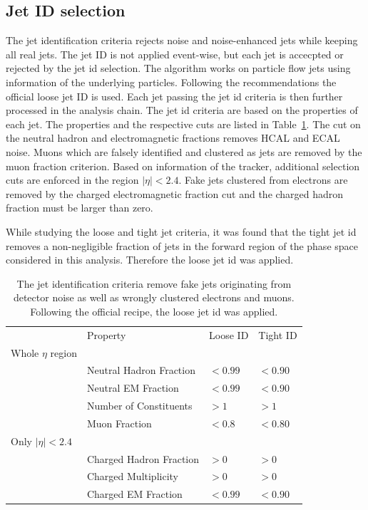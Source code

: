 \subsection{Jet ID selection}

The jet identification criteria rejects noise and noise-enhanced
jets while keeping all real jets. The jet ID is not applied event-wise, but each
jet is accecpted or rejected by the jet id selection. The algorithm works on
particle flow jets using information of the underlying particles. 
Following the recommendations the official loose jet ID is used. Each jet
passing the jet id criteria is then further processed in the analysis chain. The
jet id criteria are based on the properties of each jet. The properties and the
respective cuts are listed in Table~\ref{tab:jetid}. The cut on the neutral
hadron and electromagnetic fractions removes HCAL and ECAL noise. Muons which
are falsely identified and clustered as jets are removed by the muon fraction
criterion. Based on information of the tracker, additional selection cuts are
enforced in the region $|\eta| < 2.4$. Fake jets clustered from electrons are
removed by the charged electromagnetic fraction cut and the charged hadron
fraction must be larger than zero.

While studying the loose and tight jet criteria, it was found that the tight jet
id removes a non-negligible fraction of jets in the forward region of the
phase space considered in this analysis. Therefore the loose jet id was applied.

\begin{table}[htbp]
    \centering
    \caption[Jet Identification Criteria]{The jet identification criteria remove fake jets originating from
    detector noise as well as wrongly clustered electrons and muons. Following
    the official recipe, the loose jet id was applied.}
    \label{tab:jetid}
    \begin{tabular}{llll}
    \toprule
                           & Property                & Loose ID & Tight ID\\\cmidrule(lr){2-4}
    Whole $\eta$ region    &                         &          & \\\cmidrule(lr){1-1}
                           & Neutral Hadron Fraction & $< 0.99$ & $< 0.90$\\
                           & Neutral EM Fraction     & $< 0.99$ & $< 0.90$\\
                           & Number of Constituents  & $> 1$    & $> 1$\\
                           & Muon Fraction           & $< 0.8$  & $< 0.80$\\
    Only $|\eta| < 2.4$    &                         &          & \\\cmidrule(lr){1-1}
                           & Charged Hadron Fraction & $> 0$    & $> 0$\\
                           & Charged Multiplicity    & $> 0$    & $> 0$\\
                           & Charged EM Fraction     & $< 0.99$ & $< 0.90$\\
    \bottomrule
    \end{tabular}
\end{table}


